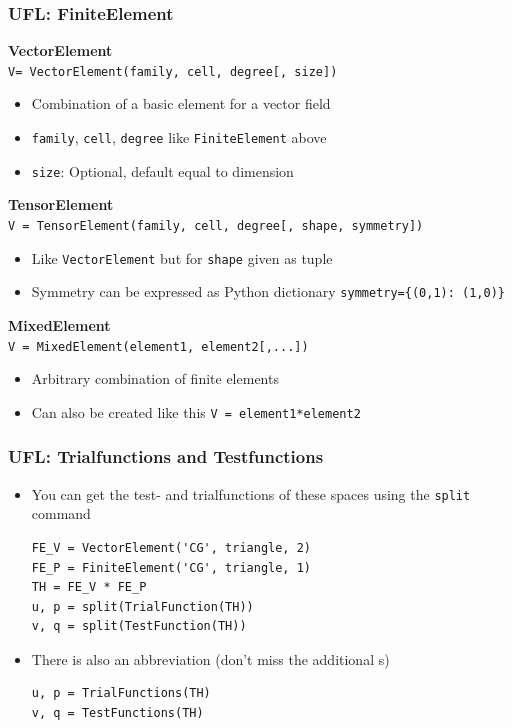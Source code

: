 \documentclass[aspectratio=169,11pt]{beamer}
\theoremstyle{definition}
\begin{document}
\begin{frame}[fragile]
  \frametitle{UFL: FiniteElement}
  \textbf{VectorElement}\\
  \lstinline[basicstyle=\small]{V= VectorElement(family, cell, degree[, size])}
  \begin{itemize}
  \item Combination of a basic element for a vector field
  \item \lstinline{family}, \lstinline{cell}, \lstinline{degree} like \lstinline{FiniteElement} above
  \item \lstinline{size}: Optional, default equal to dimension
  \end{itemize}

  \textbf{TensorElement}\\
  \lstinline[basicstyle=\small]{V = TensorElement(family, cell, degree[, shape, symmetry])}
  \begin{itemize}
  \item Like \lstinline{VectorElement} but for \lstinline{shape} given as tuple
  \item Symmetry can be expressed as Python dictionary
    \lstinline|symmetry={(0,1): (1,0)}|
  \end{itemize}

  \textbf{MixedElement}\\
  \lstinline[basicstyle=\small]{V = MixedElement(element1, element2[,...])}
  \begin{itemize}
  \item Arbitrary combination of finite elements
  \item Can also be created like this \lstinline{V = element1*element2}
  \end{itemize}
\end{frame}


\begin{frame}[fragile]
  \frametitle{UFL: Trialfunctions and Testfunctions}
  \begin{itemize}
  \item You can get the test- and trialfunctions of these spaces using the
    \lstinline{split} command
  \begin{lstlisting}[basicstyle=\small, backgroundcolor=\color{listingbg}]
FE_V = VectorElement('CG', triangle, 2)
FE_P = FiniteElement('CG', triangle, 1)
TH = FE_V * FE_P
u, p = split(TrialFunction(TH))
v, q = split(TestFunction(TH))
  \end{lstlisting}
  \item There is also an abbreviation (don't miss the additional s)
    \begin{lstlisting}[basicstyle=\small, backgroundcolor=\color{listingbg}]
u, p = TrialFunctions(TH)
v, q = TestFunctions(TH)
    \end{lstlisting}
  \end{itemize}
\end{frame}
\end{document}
